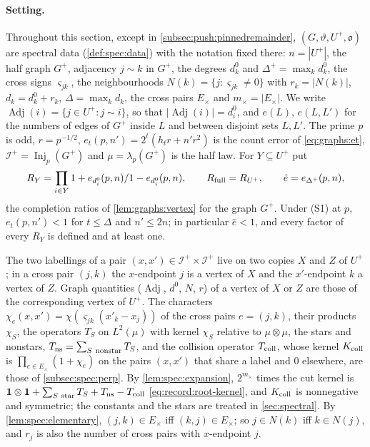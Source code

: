 \paragraph{Setting.}
Throughout this section, except in \cref{subsec:push:pinnedremainder},
$(G,\vartheta,U^+,\mathfrak o)$ are spectral data (\cref{def:spec:data}) with the
notation fixed there: $n=|U^+|$, the half graph $G^+$, adjacency $j\sim k$ in
$G^+$, the degrees $d^0_k$ and $\Delta^+=\max_kd^0_k$, the cross signs
$\varsigma_{jk}$, the neighbourhoods $N(k)=\{j:\varsigma_{jk}\ne0\}$ with
$r_k=|N(k)|$, $d_k=d^0_k+r_k$, $\Delta=\max_kd_k$, the cross pairs $E_\times$ and
$m_\times=|E_\times|$. We write $\operatorname{Adj}(i)=\{j\in U^+:j\sim i\}$, so
that $|\operatorname{Adj}(i)|=d^0_i$, and $e(L)$, $e(L,L')$ for the numbers of
edges of $G^+$ inside $L$ and between disjoint sets $L,L'$. The prime $p$ is
odd, $r=p^{-1/2}$, $e_t(p,n')=2^t(h_tr+n'r^2)$ is the count error of
\eqref{eq:graphs:et}, $\mathcal I^+=\operatorname{Inj}_p(G^+)$ and
$\mu=\lambda_p(G^+)$ is the half law. For $Y\subseteq U^+$ put
\[
 R_Y=\prod_{i\in Y}\frac{1+e_{d^0_i}(p,n)}{1-e_{d^0_i}(p,n)},\qquad
 R_{\rm full}=R_{U^+},\qquad \hat e=e_{\Delta^+}(p,n),
\]
the completion ratios of \cref{lem:graphs:vertex} for the graph $G^+$. Under
(S1) at $p$, $e_t(p,n')<1$ for $t\le\Delta$ and $n'\le2n$; in particular
$\hat e<1$, and every factor of every $R_Y$ is defined and at least one.

The two labellings of a pair $(x,x')\in\mathcal I^+\times\mathcal I^+$ live on two
copies $X$ and $Z$ of $U^+$; in a cross pair $(j,k)$ the $x$-endpoint $j$ is a
vertex of $X$ and the $x'$-endpoint $k$ a vertex of $Z$. Graph quantities
($\operatorname{Adj}$, $d^0$, $N$, $r$) of a vertex of $X$ or $Z$ are those of
the corresponding vertex of $U^+$. The characters
$\chi_e(x,x')=\chi(\varsigma_{jk}(x'_k-x_j))$ of the cross pairs $e=(j,k)$, their
products $\chi_S$, the operators $T_S$ on $L^2(\mu)$ with kernel $\chi_S$ relative to
$\mu\otimes\mu$, the stars and nonstars, $T_{\rm ns}=\sum_{S\ \rm nonstar}T_S$, and
the collision operator $T_{\rm coll}$, whose kernel $K_{\rm coll}$ is
$\prod_{e\in E_\times}(1+\chi_e)$ on the pairs $(x,x')$ that share a label and $0$
elsewhere, are those of \cref{subsec:spec:perp}. By \cref{lem:spec:expansion},
$2^{m_\times}$ times the cut kernel is
$\one\otimes\one+\sum_{S\ \rm star}T_S+T_{\rm ns}-T_{\rm coll}$
\eqref{eq:record:root-kernel}, and $K_{\rm coll}$ is nonnegative and symmetric; the
constants and the stars are treated in \cref{sec:spectral}. By \cref{lem:spec:elementary},
$(j,k)\in E_\times$ iff $(k,j)\in E_\times$; so $j\in N(k)$ iff $k\in N(j)$, and $r_j$
is also the number of cross pairs with $x$-endpoint $j$.

